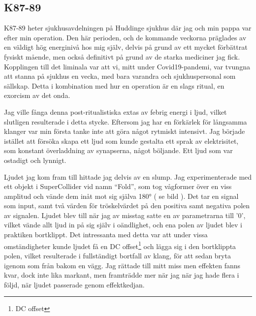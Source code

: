 \documentclass{article}
\begin{document}
\subsection{K87-89}
K87-89 heter sjukhusavdelningen på Huddinge sjukhus där jag och min pappa var efter min operation. Den här
perioden, och de kommande veckorna präglades av en väldigt hög energinivå hos mig själv, delvis på grund av
ett mycket förbättrat fysiskt mående, men också definitivt på grund av de starka mediciner jag fick.
Kopplingen till det liminala var att vi, mitt under Covid19-pandemi, var tvungna att stanna på sjukhus en
vecka, med bara varandra och sjukhuspersonal som sällskap. Detta i kombination med hur en operation är en
slags ritual, en exorcism av det onda. 

Jag ville fånga denna post-ritualistiska extas av febrig energi i ljud, vilket slutligen resulterade i detta
stycke. Eftersom jag har en förkärlek för långsamma klanger var min första tanke inte att göra något
rytmiskt intensivt. Jag började istället att försöka skapa ett ljud som kunde gestalta ett sprak av
elektrisitet, som konstant överladdning av synapserna, något böljande. Ett ljud som var ostadigt och
lynnigt. 

Ljudet jag kom fram till hittade jag delvis av en slump. Jag experimenterade med ett objekt i
SuperCollider vid namn ``Fold'', som tog vågformer över en viss amplitud och vände dem inåt mot sig själva
180° ( se bild ). Det tar en signal som input, samt två värden för tröskelvärdet på den positiva samt
negativa polen av signalen. Ljudet blev till när jag av misstag satte en av parametrarna till '0', vilket
vände allt ljud in på sig själv i oändlighet, och ena polen av ljudet blev i praktiken bortklippt. Det
intressanta med detta var att under vissa omständigheter kunde ljudet få en DC offset\footnote{DC offset}
och lägga sig i den bortklippta polen, vilket resulterade i fullständigt bortfall av klang, för att sedan
bryta igenom som från bakom en vägg. Jag rättade till mitt miss men effekten fanns kvar, dock inte lika
markant, men framträdde mer när jag när jag hade flera i följd, när ljudet passerade genom effektkedjan.
\end{document}
